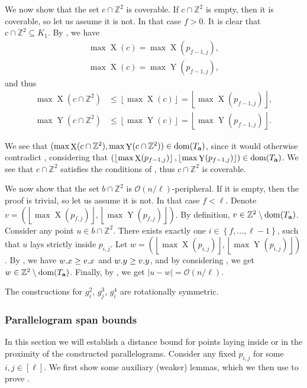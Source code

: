 \documentclass[11pt, letterpaper]{article}
\theoremstyle{plain}
\theoremstyle{definition}
\theoremstyle{remark}
\newcommand{\Z}{\mathbb{Z}}
\renewcommand{\O}{\mathcal{O}}
\newcommand{\floor}[1]{\left\lfloor #1 \right\rfloor}
\newcommand{\set}[1]{\left\lbrace #1 \right\rbrace}
\newcommand{\eq}[1]{\begin{align*} #1 \end{align*}}
\DeclareMathOperator*{\X}{X}
\DeclareMathOperator*{\Y}{Y}
\begin{document}
We now show that the set $c \cap \Z^2$ is coverable.
If $c \cap \Z^2$ is empty, then it is coverable, so let us assume it is not.
In that case $f > 0$.
It is clear that $c \cap \Z^2 \subseteq K_1$.
By , we have 
\eq{
	\max \X(c) = \max \X(p_{f - 1, j}), \\
	\max \X(c) = \max \Y(p_{f - 1, j}),
}
and thus
\eq{
	\max \X(c \cap \Z^2) &\le \floor{\max \X(c)} = \floor{\max \X(p_{f - 1, j})}, \\
	\max \Y(c \cap \Z^2) &\le \floor{\max \Y(c)} = \floor{\max \Y(p_{f - 1, j})}.
}

We see that $(\max \X(c \cap \Z^2), \max \Y(c \cap \Z^2)) \in \d{\Ta}$, since it would otherwise contradict ,
considering that
$(\floor{\max \X(p_{f - 1, j})}, \floor{\max \Y(p_{f - 1, j})}) \in \d{\Ta}$.
We see that $c \cap \Z^2$ satisfies the conditions of , thus $c \cap \Z^2$ is coverable.

We now show that the set $b \cap \Z^2$ is $\O(n / \ell)$-peripheral.
If it is empty, then the proof is trivial, so let us assume it is not.
In that case $f < \ell$.
Denote $v = (\floor{\max \X(p_{f, j})}, \floor{\max \Y(p_{f, j})})$.
By definition, $v \in \Z^2 \setminus \d{\Ta}$.
Consider any point $u \in b \cap \Z^2$.
There exists exactly one $i \in \set{f, \dots, \ell - 1}$, such that $u$ lays strictly inside $p_{i, j}$.
Let $w = (\floor{\max \X(p_{i, j})}, \floor{\max \Y(p_{i, j})})$.
By , we have $w.x \ge v.x$ and $w.y \ge v.y$, and by considering ,
we get $w \in \Z^2 \setminus \d{\Ta}$.
Finally, by , we get $|u - w| = \O(n / \ell)$.

The constructions for $g^2_i$, $g^3_j$, $g^4_i$ are rotationally symmetric.


\subsubsection{Parallelogram span bounds} \label{distance_bound_lemma_proof}

In this section we will establish a distance bound for points laying inside or in the proximity of the constructed parallelograms.
Consider any fixed $p_{i, j}$ for some $i, j \in [\ell]$.
We first show some auxiliary (weaker) lemmas, which we then use to prove .
\end{document}
